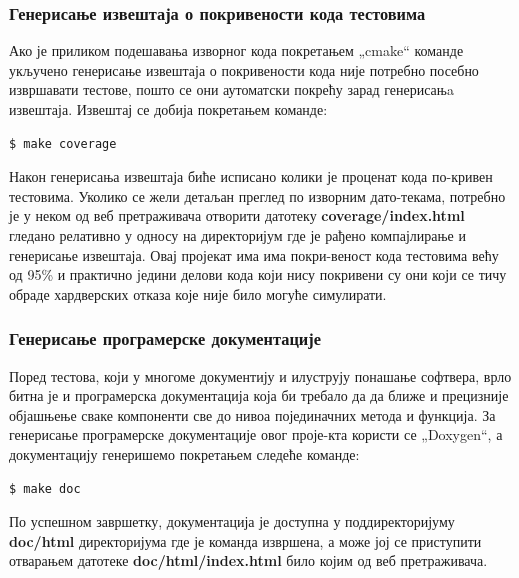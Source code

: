 \documentclass[a4paper, 12pt, diplomski]{etfcyr}
\def\quote#1{„#1“}
\begin{document}
				\subsubsection*{Генерисање извештаја о покривености кода тестовима}
					\begin{justify}
						Ако је приликом подешавања изворног кода покретањем \quote{cmake} команде укључено генерисање извештаја о покривености кода није потребно посебно извршавати тестове, пошто се они аутоматски покрећу зарад генерисањa извештаја. Извештај се добија покретањем команде:
						\begin{footnotesize}
							\begin{verbatim}
$ make coverage
							\end{verbatim}
						\end{footnotesize}
						Након генерисања извештаја биће исписано колики је проценат кода по-кривен тестовима. Уколико се жели детаљан преглед по изворним дато-текама, потребно је у неком од веб претраживача отворити датотеку \textbf{coverage/index.html} гледано релативно у односу на директоријум где је рађено компајлирање и генерисање извештаја. Овај пројекат има има покри-веност кода тестовима већу од 95\% и практично једини делови кода који нису покривени су они који се тичу обраде хардверских отказа које није било могуће симулирати.
					\end{justify}

				\subsubsection{Генерисање програмерске документације}
					\begin{justify}
						Поред тестова, који у многоме документију и илуструју понашање софтвера, врло битна је и програмерска документација која би требало да да ближе и прецизније објашњење сваке компоненти све до нивоа појединачних метода и функција. За генерисање програмерске документације овог проје-кта користи се \quote{Doxygen}, а документацију генеришемо покретањем следеће команде:
						\begin{footnotesize}
							\begin{verbatim}
$ make doc
							\end{verbatim}
						\end{footnotesize}
						По успешном завршетку, документација је доступна у поддиректоријуму \textbf{doc/html} директоријума где је команда извршена, а може јој се приступити отварањем датотеке \textbf{doc/html/index.html} било којим од веб претраживача.
					\end{justify}
\end{document}
